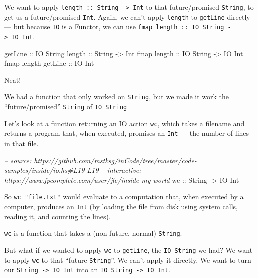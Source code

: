 \documentclass[]{article}
\newenvironment{Shaded}{}{}
\newcommand{\DataTypeTok}[1]{\textcolor[rgb]{0.56,0.13,0.00}{#1}}
\newcommand{\CommentTok}[1]{\textcolor[rgb]{0.38,0.63,0.69}{\textit{#1}}}
\newcommand{\OtherTok}[1]{\textcolor[rgb]{0.00,0.44,0.13}{#1}}
\newcommand{\NormalTok}[1]{#1}
\begin{document}
We want to apply \texttt{length\ ::\ String\ -\textgreater{}\ Int} to that
future/promised \texttt{String}, to get us a future/promised \texttt{Int}.
Again, we can't apply \texttt{length} to \texttt{getLine} directly --- but
because \texttt{IO} is a Functor, we can use
\texttt{fmap\ length\ ::\ IO\ String\ -\textgreater{}\ IO\ Int}.

\begin{Shaded}
\begin{Highlighting}[]
\NormalTok{getLine}\OtherTok{             ::} \DataTypeTok{IO} \DataTypeTok{String}
\NormalTok{length}\OtherTok{              ::} \DataTypeTok{String} \OtherTok{->} \DataTypeTok{Int}
\NormalTok{fmap}\OtherTok{ length         ::} \DataTypeTok{IO} \DataTypeTok{String} \OtherTok{->} \DataTypeTok{IO} \DataTypeTok{Int}
\NormalTok{fmap length}\OtherTok{ getLine ::} \DataTypeTok{IO} \DataTypeTok{Int}
\end{Highlighting}
\end{Shaded}

Neat!

We had a function that only worked on \texttt{String}, but we made it work the
``future/promised'' \texttt{String} of \texttt{IO\ String}

Let's look at a function returning an IO action \texttt{wc}, which takes a
filename and returns a program that, when executed, promises an \texttt{Int} ---
the number of lines in that file.

\begin{Shaded}
\begin{Highlighting}[]
\CommentTok{-- source: https://github.com/mstksg/inCode/tree/master/code-samples/inside/io.hs#L19-L19}
\CommentTok{-- interactive: https://www.fpcomplete.com/user/jle/inside-my-world}
\OtherTok{wc ::} \DataTypeTok{String} \OtherTok{->} \DataTypeTok{IO} \DataTypeTok{Int}
\end{Highlighting}
\end{Shaded}

So \texttt{wc\ "file.txt"} would evaluate to a computation that, when executed
by a computer, produces an \texttt{Int} (by loading the file from disk using
system calls, reading it, and counting the lines).

\texttt{wc} is a function that takes a (non-future, normal) \texttt{String}.

But what if we wanted to apply \texttt{wc} to \texttt{getLine}, the
\texttt{IO\ String} we had? We want to apply \texttt{wc} to that ``future
\texttt{String}''. We can't apply it directly. We want to turn our
\texttt{String\ -\textgreater{}\ IO\ Int} into an
\texttt{IO\ String\ -\textgreater{}\ IO\ Int}.
\end{document}

